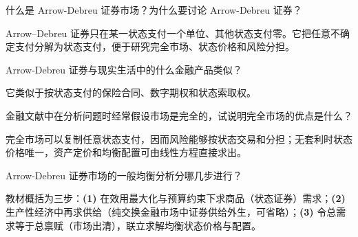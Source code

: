 
\begin{problem}
 什么是 Arrow-Debreu 证券市场？为什么要讨论 Arrow-Debreu 证券？
\end{problem}
\begin{solution}
Arrow--Debreu 证券只在某一状态支付一个单位、其他状态支付零。它把任意不确定支付分解为状态支付，便于研究完全市场、状态价格和风险分担。
\end{solution}
\begin{problem}
 Arrow-Debreu 证券与现实生活中的什么金融产品类似？
\end{problem}
\begin{solution}
它类似于按状态支付的保险合同、数字期权和状态索取权。
\end{solution}
\begin{problem}
 金融文献中在分析问题时经常假设市场是完全的，试说明完全市场的优点是什么？
\end{problem}
\begin{solution}
完全市场可以复制任意状态支付，因而风险能够按状态交易和分担；无套利时状态价格唯一，资产定价和均衡配置可由线性方程直接求出。
\end{solution}
\begin{problem}
 Arrow-Debreu 证券市场的一般均衡分析分哪几步进行？
\end{problem}
\begin{solution}
教材概括为三步：\textbf{(1)} 在效用最大化与预算约束下求商品（状态证券）需求；\textbf{(2)} 生产性经济中再求供给（纯交换金融市场中证券供给外生，可省略）；\textbf{(3)} 令总需求等于总禀赋（市场出清），联立求解均衡状态价格与配置。
\end{solution}

